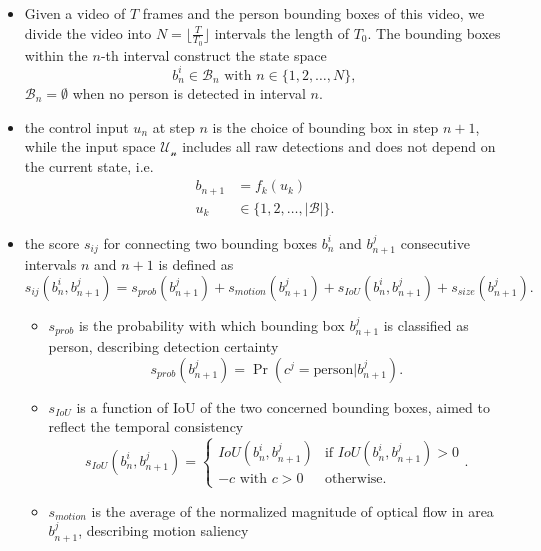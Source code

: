 \begin{itemize}
\item Given a video of $ T $ frames and the person bounding boxes of this video, we divide the video into $ N = \lfloor\frac{T}{T_{0}}\rfloor$ intervals the length of $ T_{0} $. 
The bounding boxes within the $ n$-th interval construct the state space 
\[ b_{n}^{i}\in\mathcal{B}_{n} \text{ with } n\in\lbrace1,2,\dots, N\rbrace, \] 
$ \mathcal{B}_{n} = \emptyset $ when no person is detected in interval $ n $.
\item the control input $ u_{n} $ at step $ n $ is the choice of bounding box in step $ n+1 $,  while the input space $ \mathcal{U_{n}} $ includes all raw detections and does not depend on the current state, i.e.
\begin{align*}
b_{n+1} & = f_{k}\left(u_{k}\right) \\
u_{k} & \in \lbrace 1, 2, \dots, \lvert \mathcal{B} \rvert\rbrace.
\end{align*}
\item the score $ s_{ij} $ for connecting two bounding boxes $ b^{i}_{n} $ and $ b^{j}_{n+1} $ consecutive intervals $ n $ and $ n+1 $ is defined as
\begin{equation}
s_{ij}\left(b^{i}_{n}, b^{j}_{n+1}\right) = s_{prob}\left(b^{j}_{n+1}\right) + s_{motion}\left(b^{j}_{n+1}\right)+ s_{IoU}\left(b^{i}_{n}, b^{j}_{n+1}\right) + s_{size}\left(b^{j}_{n+1}\right).
\end{equation}
\begin{itemize}
\item $ s_{prob} $ is the probability with which bounding box $ b_{n+1}^{j} $ is classified as person, describing detection certainty
\begin{equation}
s_{prob}\left(b^{j}_{n+1}\right) = \Pr\left(c^{j}=\text{person}|b^{j}_{n+1}\right).
\end{equation} 
\item $ s_{IoU} $ is a function of IoU of the two concerned bounding boxes,  aimed to reflect the temporal consistency
\begin{equation}
s_{IoU}\left(b^{i}_{n}, b^{j}_{n+1}\right) = 
\begin{cases}
IoU\left(b^{i}_{n}, b^{j}_{n+1}\right) & \text{if } IoU\left(b^{i}_{n}, b^{j}_{n+1}\right)>0\\
-c \text{ with } c>0 & \text{otherwise}.
\end{cases}.
\end{equation}
\item $ s_{motion} $ is the average of the normalized magnitude of optical flow in area $ b_{n+1}^{j} $, describing motion saliency 

\end{itemize}
\end{itemize}
